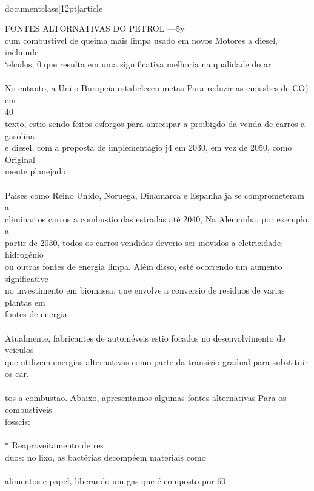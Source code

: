 \\documentclass[12pt]{article}
\begin{document}
{{{{{FONTES ALTORNATIVAS DO PETROL —5y\\
cum combustivel de queima mais limpa usado em novos Motores a diesel, ineluinde\\
‘elculos, 0 que resulta em uma significativa melhoria na qualidade do ar\\
\\
No entanto, a Uniio Buropeia estabeleceu metas Para reduzir as emissbes de CO) em\\
40\\%
texto, estio sendo feitos esforgos para antecipar a proibigdo da venda de carros a gasolina\\
e diesel, com a proposta de implementagio j4 em 2030, em vez de 2050, como Original\\
mente planejado.\\
\\
Paises como Reino Unido, Noruega, Dinamarca e Espanha ja se comprometeram a\\
climinar os carros a combustio das estradas até 2040, Na Alemanha, por exemplo, a\\
partir de 2030, todos os carros vendidos deverio ser movidos a eletricidade, hidrogénio\\
ou outras fontes de energia limpa. Além disso, esté ocorrendo um aumento significative\\
no investimento em biomassa, que envolve a conversio de residuos de varias plantas em\\
fontes de energia.\\
\\
Atualmente, fabricantes de automéveis estio focados no desenvolvimento de veiculos\\
que utilizem energias alternativas como parte da transi¢io gradual para substituir os car.\\
\\
tos a combustao. Abaixo, apresentamos algumas fontes alternativas Para os combustiveis\\
fosscis:\\
\\
* Reaproveitamento de res\\{duos: no lixo, as bactérias decompéem materiais como\\
\\
alimentos e papel, liberando um gas que é composto por 60\\%
}}}}}}
\end{document}
